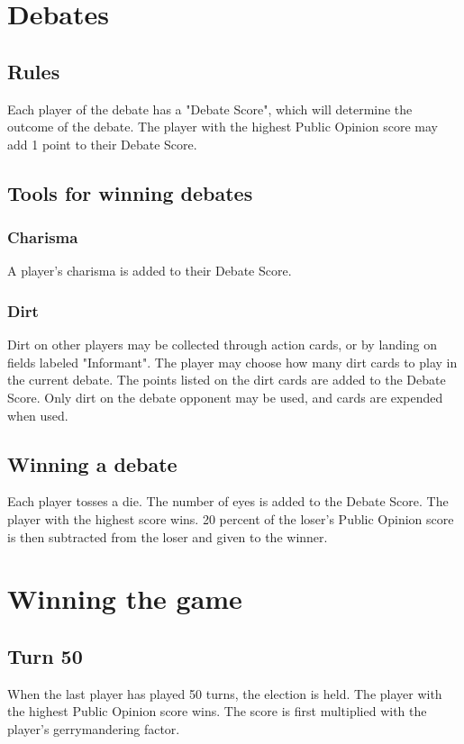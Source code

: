 \documentclass[a4paper,11pt]{amsart}
\begin{document}
\section{Debates}
\subsection{Rules}
Each player of the debate has a "Debate Score", which will determine the outcome of the debate. The player with the highest Public Opinion score may add 1 point to their Debate Score.
\subsection{Tools for winning debates}
\subsubsection{Charisma}
A player's charisma is added to their Debate Score.
\subsubsection{Dirt}
Dirt on other players may be collected through action cards, or by landing on fields labeled "Informant". The player may choose how many dirt cards to play in the current debate. The points listed on the dirt cards are added to the Debate Score.
Only dirt on the debate opponent may be used, and cards are expended when used.

\subsection{Winning a debate}
Each player tosses a die. The number of eyes is added to the Debate Score. The player with the highest score wins. 20 percent of the loser's Public Opinion score is then subtracted from the loser and given to the winner.

\section{Winning the game}
\subsection{Turn 50}
When the last player has played 50 turns, the election is held. The player with the highest Public Opinion score wins. The score is first multiplied with the player's gerrymandering factor.
\end{document}
